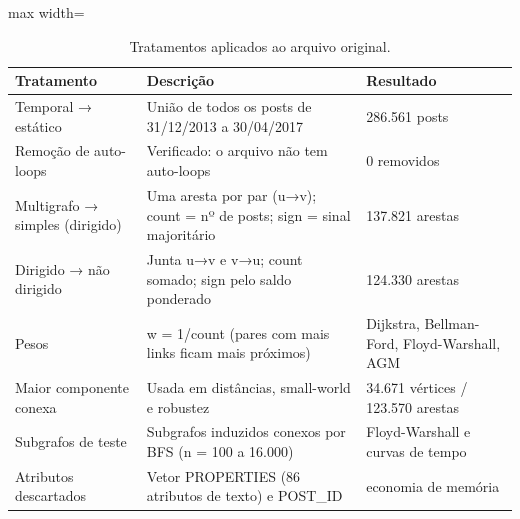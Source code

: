 \begin{table}[t]
\centering
\small
\caption{Tratamentos aplicados ao arquivo original.}
\label{tab:tratamento}
\begin{adjustbox}{max width=\linewidth}
\begin{tabular}{lll}
\toprule
Tratamento & Descrição & Resultado \\
\midrule
Temporal → estático & União de todos os posts de 31/12/2013 a 30/04/2017 & 286.561 posts \\
Remoção de auto-loops & Verificado: o arquivo não tem auto-loops & 0 removidos \\
Multigrafo → simples (dirigido) & Uma aresta por par (u→v); count = nº de posts; sign = sinal majoritário & 137.821 arestas \\
Dirigido → não dirigido & Junta u→v e v→u; count somado; sign pelo saldo ponderado & 124.330 arestas \\
Pesos & w = 1/count (pares com mais links ficam mais próximos) & Dijkstra, Bellman-Ford, Floyd-Warshall, AGM \\
Maior componente conexa & Usada em distâncias, small-world e robustez & 34.671 vértices / 123.570 arestas \\
Subgrafos de teste & Subgrafos induzidos conexos por BFS (n = 100 a 16.000) & Floyd-Warshall e curvas de tempo \\
Atributos descartados & Vetor PROPERTIES (86 atributos de texto) e POST\_ID & economia de memória \\
\bottomrule
\end{tabular}
\end{adjustbox}
\end{table}
